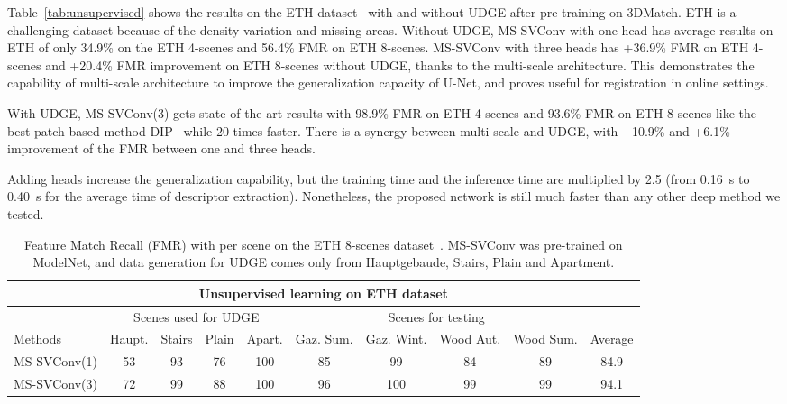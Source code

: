 \documentclass[10pt,twocolumn,letterpaper]{article}
\begin{document}
Table~\ref{tab:unsupervised} shows the results on the ETH dataset~\cite{Pomerleau:2012} with and without UDGE after pre-training on 3DMatch. ETH is a challenging dataset because of the density variation and missing areas. Without UDGE, MS-SVConv with one head has average results on ETH of only 34.9\% on the ETH 4-scenes and 56.4\% FMR on ETH 8-scenes. MS-SVConv with three heads has +36.9\% FMR on ETH 4-scenes and +20.4\% FMR improvement on ETH 8-scenes without UDGE, thanks to the multi-scale architecture. This demonstrates the capability of multi-scale architecture to improve the generalization capacity of U-Net, and proves useful for registration in online settings.


With UDGE, MS-SVConv(3) gets state-of-the-art results with 98.9\% FMR on ETH 4-scenes and 93.6\% FMR on ETH 8-scenes like the best patch-based method DIP~\cite{Poiesi2021} while 20 times faster. There is a synergy between multi-scale and UDGE, with +10.9\% and +6.1\% improvement of the FMR between one and three heads. 

Adding heads increase the generalization capability, but the training time and the inference time are multiplied by 2.5 (from 0.16~s to 0.40~s for the average time of descriptor extraction). Nonetheless, the proposed network is still much faster than any other deep method we tested. 






\begin{table*}[ht]
\small
\centering
\begin{tabular}[t]{l|cccc|cccc|c}
\toprule
\multicolumn{10}{c}{\textbf{Unsupervised learning on ETH dataset}} \\
\midrule
 & \multicolumn{4}{c|}{Scenes used for UDGE} & \multicolumn{4}{c|}{Scenes for testing} & \\
Methods & Haupt. & Stairs & Plain & Apart. & Gaz. Sum. & Gaz. Wint.  & Wood Aut. & Wood Sum. & Average \\
\midrule
MS-SVConv(1) & 53 & 93 & 76 & 100 & 85 & 99 & 84 & 89 & 84.9 \\
MS-SVConv(3) & 72 & 99 & 88 & 100 & 96 & 100 & 99 & 99 & 94.1 \\
\bottomrule
\end{tabular}
\caption{Feature Match Recall (FMR) with  per scene on the ETH 8-scenes dataset~\cite{fontana2020benchmark}. MS-SVConv was pre-trained on ModelNet, and data generation for UDGE  comes only from Hauptgebaude, Stairs, Plain and Apartment.} 
\label{tab:ethsplitfontana}
\end{table*}
\end{document}
